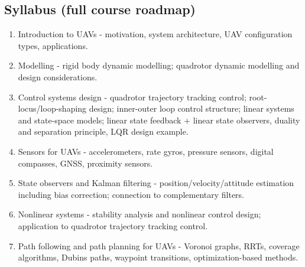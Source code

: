 \documentclass[11pt]{article}
\begin{document}
\subsection{Syllabus (full course roadmap)}
\begin{enumerate}
\item Introduction to UAVs - motivation, system architecture, UAV configuration types, applications.
\item Modelling - rigid body dynamic modelling; quadrotor dynamic modelling and design considerations.
\item Control systems design - quadrotor trajectory tracking control; root-locus/loop-shaping design; inner-outer loop control structure; linear systems and state-space models; linear state feedback + linear state observers, duality and separation principle, LQR design example.
\item Sensors for UAVs - accelerometers, rate gyros, pressure sensors, digital compasses, GNSS, proximity sensors.
\item State observers and Kalman filtering - position/velocity/attitude estimation including bias correction; connection to complementary filters.
\item Nonlinear systems - stability analysis and nonlinear control design; application to quadrotor trajectory tracking control.
\item Path following and path planning for UAVs - Voronoi graphs, RRTs, coverage algorithms, Dubins paths, waypoint transitions, optimization-based methods.
\end{enumerate}
\end{document}
